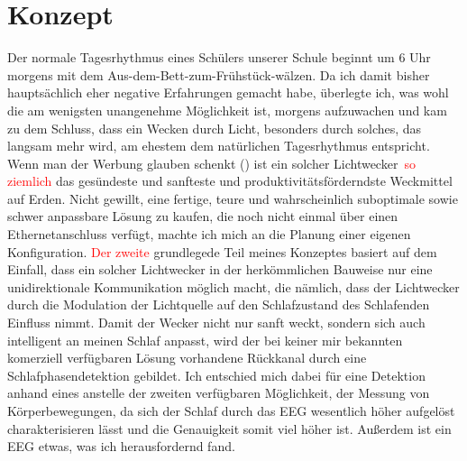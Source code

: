 \documentclass[12pt,a4paper,notitlepage]{article}
\newcommand{\annot}[1]{\textcolor{red}{#1}}
\begin{document}
\section{Konzept}
Der normale Tagesrhythmus eines Schülers unserer Schule beginnt um 6 Uhr morgens mit dem Aus-dem-Bett-zum-Frühstück-wälzen. Da ich damit bisher hauptsächlich eher negative Erfahrungen gemacht habe, überlegte ich, was wohl die am wenigsten unangenehme Möglichkeit ist, morgens aufzuwachen und kam zu dem Schluss, dass ein Wecken durch Licht, besonders durch solches, das langsam mehr wird, am ehestem dem natürlichen Tagesrhythmus entspricht. Wenn man der Werbung glauben schenkt (\cite{WERBUNG1}\cite{WERBUNG2}\cite{WERBUNG3}\cite{WERBUNG4}\cite{WERBUNG5}\cite{WERBUNG6}\cite{WERBUNG7}\cite{WERBUNG8})
ist ein solcher \glqq Lichtwecker\grqq\ \annot{so ziemlich} das gesündeste und sanfteste und produktivitätsförderndste Weckmittel auf Erden\cite{SIESTA1}. Nicht gewillt, eine fertige, teure und wahrscheinlich suboptimale sowie schwer anpassbare Lösung zu kaufen, die noch nicht einmal über einen Ethernetanschluss verfügt, machte ich mich an die Planung einer eigenen Konfiguration. \annot{Der zweite} grundlegede Teil meines Konzeptes basiert auf dem Einfall, dass ein solcher Lichtwecker in der herkömmlichen Bauweise nur eine unidirektionale Kommunikation möglich macht, die nämlich, dass der Lichtwecker durch die Modulation der Lichtquelle auf den Schlafzustand des Schlafenden Einfluss nimmt. Damit der Wecker nicht nur sanft weckt, sondern sich auch intelligent an meinen Schlaf anpasst, wird der bei keiner mir bekannten komerziell verfügbaren Lösung vorhandene Rückkanal durch eine Schlafphasendetektion gebildet. Ich entschied mich dabei für eine Detektion anhand eines  anstelle der zweiten verfügbaren Möglichkeit, der Messung von Körperbewegungen, da sich der Schlaf durch das EEG wesentlich höher aufgelöst charakterisieren lässt und die Genauigkeit somit viel höher ist. Außerdem ist ein EEG etwas, was ich herausfordernd fand.

\end{document}
